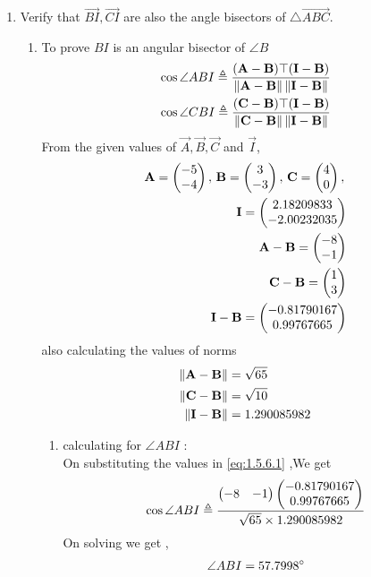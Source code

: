 \documentclass[10pt]{book}
\begin{document}
\begin{enumerate}[label=\thesection.\arabic*.,ref=\thesection.\theenumi]
\item Verify that $\vec{BI}, \vec{CI}$ are also the angle bisectors of $\triangle \vec{ABC}$. \\
\solution
\begin{enumerate}
    \item To prove $BI$ is an angular bisector of $ \angle B$
\begin{align}
\label{eq:1.5.6.1}
\cos{\angle ABI} \triangleq \frac{(\vec{A}-\vec{B})\top(\vec{I}-\vec{B})}{\norm{\vec{A}-\vec{B}}\norm{\vec{I}-\vec{B}}} \\
\cos{\angle CBI} \triangleq \frac{(\vec{C}-\vec{B})\top(\vec{I}-\vec{B})}{\norm{\vec{C}-\vec{B}}\norm{\vec{I}-\vec{B}}} 
\end{align}
From the given values of $\vec{A},\vec{B},\vec{C}$ and $\vec{I}$,\\
\begin{align}
    \mathbf{A}=\begin{pmatrix}-5 \\ -4\end{pmatrix},\,
    \mathbf{B}=\begin{pmatrix}3\\-3\end{pmatrix},\,
    \mathbf{C}=\begin{pmatrix}4\\0\end{pmatrix},\, \\
    \mathbf{I}=\begin{pmatrix}2.18209833 \\ -2.00232035\end{pmatrix}\\
	\mathbf{A}-\mathbf{B} =\begin{pmatrix}-8\\-1\end{pmatrix} \\
	\mathbf{C}-\mathbf{B} = \begin{pmatrix}1\\3\end{pmatrix} \\
 \mathbf{I}-\mathbf{B} =\begin{pmatrix}-0.81790167 \\ 0.99767665\end{pmatrix}
\end{align}
also calculating the values of norms
\begin{align}
	\left\lVert\mathbf{A}-\mathbf{B}\right\rVert &= \sqrt{65}\\
	\left\lVert\mathbf{C}-\mathbf{B}\right\rVert &= \sqrt{10} \\
 	\left\lVert\mathbf{I}-\mathbf{B}\right\rVert &= 1.290085982 \\
\end{align}


\begin{enumerate}[label=(\alph*)]
    \item calculating for $\angle ABI$ : \\
    On substituting the values in  \eqref{eq:1.5.6.1} ,We get 
    \begin{align}
        \cos{\angle ABI} \triangleq \frac{\begin{pmatrix} -8 & -1\end{pmatrix}\begin{pmatrix}-0.81790167 \\ 0.99767665\end{pmatrix}}{ \sqrt{65}\times 1.290085982} \\
    \end{align}
    On solving we get ,
    \begin{align}
        \angle ABI =57.7998 \degree
    \end{align}
    

\end{enumerate}
\end{enumerate}
\end{enumerate}
\end{document}
